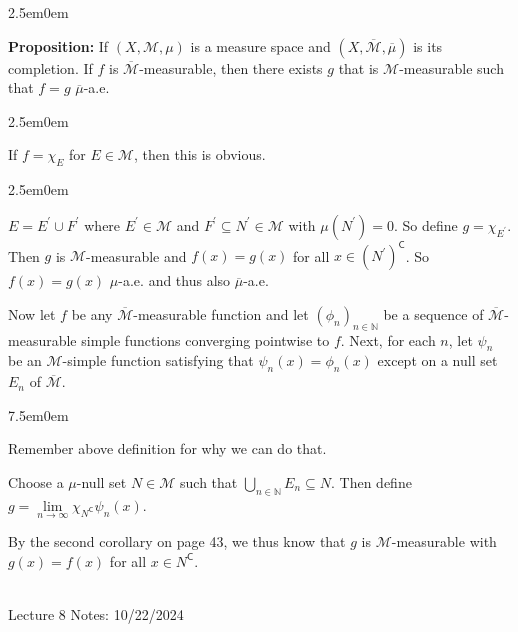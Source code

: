 \documentclass{book}
\newcommand{\hOne}{%
   \color{Black}%
   \fontsize{14}{16}\selectfont%
}
\newcommand{\hTwo}{%
\color{MidnightBlue}%
   \fontsize{13}{15}\selectfont%
}
\newcommand{\hThree}{%
   \color{PineGreen!85!Orange}
   \fontsize{12}{14}\selectfont%
}
\newcommand{\hFour}{%
   \color{Cyan!80!black}
   \fontsize{12}{14}\selectfont%
}
\newcommand{\myComment}{%
   \color{RawerSienna}%
   \fontsize{12}{14}\selectfont%
}
\newenvironment{myIndent}{%
   \begin{adjustwidth}{2.5em}{0em}%
}{%
   \end{adjustwidth}%
}
\newenvironment{myTindent}{%
   \begin{adjustwidth}{7.5em}{0em}%
}{%
   \end{adjustwidth}%
}
\newcommand{\blab}[1]{\textbf{#1}}
\newcommand{\comp}{\mathsf{C}}
\newcommand{\mySepTwo}[1][.]{%
   {\noindent\color{#1}{\rule{6.5in}{0.5mm}}}\\%
}
\newcommand{\retTwo}{\hfill\bigbreak}
\newcommand{\mHeader}[1]{{
   \color{Black}%
   \fontsize{20}{18}\selectfont%
   #1\retTwo
}}
\begin{document}
\hOne
\begin{myIndent}\hTwo
   \blab{Proposition:} If $(X, \mathcal{M}, \mu)$ is a measure space and $(X, \overline{\mathcal{M}}, \overline{\mu})$ is its completion. If $f$ is $\overline{\mathcal{M}}$-measurable, then there exists $g$ that is $\mathcal{M}$-measurable such that $f = g$ $\overline{\mu}$-a.e.

   \begin{myIndent}\hThree
      If $f = \chi_E$ for $E \in \mathcal{M}$, then this is obvious.
      \begin{myIndent}\hFour
         $E = E^\prime \cup F^\prime$ where $E^\prime \in \mathcal{M}$ and $F^\prime \subseteq N^\prime \in \mathcal{M}$ with $\mu(N^\prime) = 0$. So define $g = \chi_{E^\prime}$. Then $g$ is $\mathcal{M}$-measurable and $f(x) = g(x)$ for all $x \in (N^\prime)^\comp$. So $f(x) = g(x)$ $\mu$-a.e. and thus also $\overline{\mu}$-a.e.\retTwo
      \end{myIndent}

      Now let $f$ be any $\overline{\mathcal{M}}$-measurable function and let $(\phi_n)_{n\in\mathbb{N}}$ be a sequence of $\overline{\mathcal{M}}$-measurable simple functions converging pointwise to $f$. Next, for each $n$, let $\psi_n$ be an $\mathcal{M}$-simple function satisfying that $\psi_n(x) = \phi_n(x)$ except on a null set $E_n$ of $\overline{\mathcal{M}}$.
      
      \begin{myTindent}\myComment
         Remember above definition for why we can do that.\retTwo
      \end{myTindent}

      Choose a $\mu$-null set $N \in \mathcal{M}$ such that $\bigcup\limits_{n \in \mathbb{N}}E_n \subseteq N$. Then define $g = \lim\limits_{n \rightarrow \infty} \chi_{N^\comp}\psi_n(x)$.\retTwo

      By the second corollary on page 43, we thus know that $g$ is $\mathcal{M}$-measurable with $g(x) = f(x)$ for all $x \in N^\comp$.
   \end{myIndent}
\end{myIndent}

\mySepTwo

\mHeader{Lecture 8 Notes: 10/22/2024}

\newpage
\end{document}
